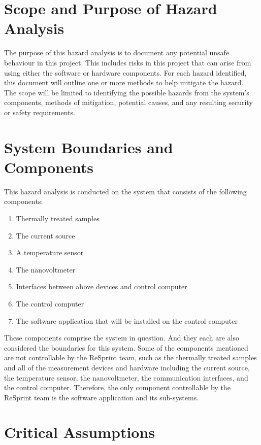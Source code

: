 \documentclass{article}
\begin{document}
\section{Scope and Purpose of Hazard Analysis}
The purpose of this hazard analysis is to document any potential unsafe behaviour in this project. 
This includes risks in this project that can arise from using either the software or hardware components.
For each hazard identified, this document will outline one or more methods to help mitigate the hazard.\\

\noindent The scope will be limited to identifying the possible hazards from the system's components, methods of mitigation, 
potential causes, and any resulting security or safety requirements.

\section{System Boundaries and Components}

\noindent This hazard analysis is conducted on the system that consists of the following components:

\begin{enumerate}
  \item Thermally treated samples
  \item The current source
  \item A temperature sensor
  \item The nanovoltmeter
  \item Interfaces between above devices and control computer
  \item The control computer
  \item The software application that will be installed on the control computer
\end{enumerate}

\noindent These components comprise the system in question. And they each are also considered the boundaries for this system. Some of the components mentioned are not controllable by the ReSprint team, such as the thermally treated samples and all of the measurement devices and hardware including the current source, the temperature sensor, the nanovoltmeter, the communication interfaces, and the control computer. Therefore, the only component controllable by the ReSprint team is the software application and its sub-systems.

\section{Critical Assumptions}
\end{document}
